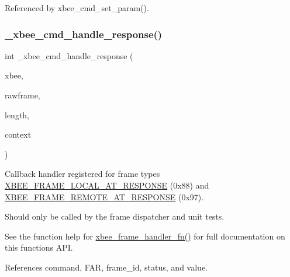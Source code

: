 Referenced by xbee\+\_\+cmd\+\_\+set\+\_\+param().

\mbox{\label{group__xbee__atcmd_ga3b4559f4e729b1c96f5c0d9e4476aa7d}} 
\subsubsection{\texorpdfstring{\+\_\+xbee\+\_\+cmd\+\_\+handle\+\_\+response()}{\_xbee\_cmd\_handle\_response()}}
{\footnotesize\ttfamily int \+\_\+xbee\+\_\+cmd\+\_\+handle\+\_\+response (\begin{DoxyParamCaption}\item[{\hyperlink{structxbee__dev__t}{xbee\+\_\+dev\+\_\+t} $\ast$}]{xbee,  }\item[{const void \hyperlink{group__hal_gaef060b3456fdcc093a7210a762d5f2ed}{F\+AR} $\ast$}]{rawframe,  }\item[{\hyperlink{group__hal__dos_ga5a8b2dc9e45a9ee81a94ef304fb62505}{uint16\+\_\+t}}]{length,  }\item[{void \hyperlink{group__hal_gaef060b3456fdcc093a7210a762d5f2ed}{F\+AR} $\ast$}]{context }\end{DoxyParamCaption})}



Callback handler registered for frame types \hyperlink{group__xbee__device_gga7753bbebaf00d6d64942f64b6ae9b7b9ae66771334070219cd098c8201936cf4a}{X\+B\+E\+E\+\_\+\+F\+R\+A\+M\+E\+\_\+\+L\+O\+C\+A\+L\+\_\+\+A\+T\+\_\+\+R\+E\+S\+P\+O\+N\+SE} (0x88) and \hyperlink{group__xbee__device_gga7753bbebaf00d6d64942f64b6ae9b7b9a3cd726459592fab4cdc9b5e6bbecb79f}{X\+B\+E\+E\+\_\+\+F\+R\+A\+M\+E\+\_\+\+R\+E\+M\+O\+T\+E\+\_\+\+A\+T\+\_\+\+R\+E\+S\+P\+O\+N\+SE} (0x97). 

Should only be called by the frame dispatcher and unit tests.

See the function help for \hyperlink{group__xbee__device_ga3e6f2b540e8cec7a69ef0b0166da14ff}{xbee\+\_\+frame\+\_\+handler\+\_\+fn()} for full documentation on this function\textquotesingle{}s A\+PI. 

References command, F\+AR, frame\+\_\+id, status, and value.

\mbox{\label{group__xbee__atcmd_ga710b2223cda09c52a8518c964da88347}} 
